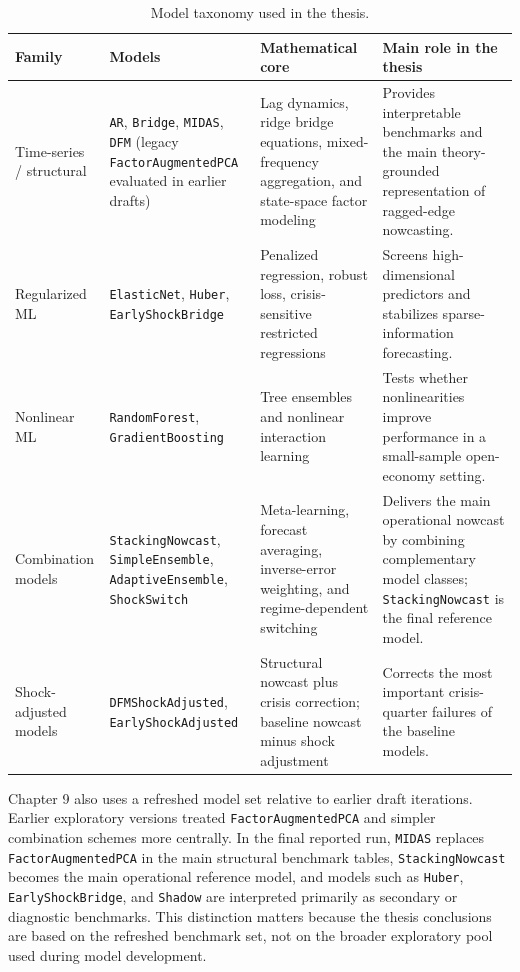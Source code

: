 \documentclass[12pt,a4paper]{article}
\begin{document}
\begin{table}[H]
    \centering
    \small
    \caption{Model taxonomy used in the thesis.}
    \label{tab:model_taxonomy_summary}
    \begin{tabularx}{\textwidth}{>{\raggedright\arraybackslash}p{2.0cm}YYY}
        \toprule
        Family & Models & Mathematical core & Main role in the thesis \\
        \midrule
        Time-series / structural & \texttt{AR}, \texttt{Bridge}, \texttt{MIDAS}, \texttt{DFM} (legacy \texttt{FactorAugmentedPCA} evaluated in earlier drafts) & Lag dynamics, ridge bridge equations, mixed-frequency aggregation, and state-space factor modeling & Provides interpretable benchmarks and the main theory-grounded representation of ragged-edge nowcasting. \\
        Regularized ML & \texttt{ElasticNet}, \texttt{Huber}, \texttt{EarlyShockBridge} & Penalized regression, robust loss, crisis-sensitive restricted regressions & Screens high-dimensional predictors and stabilizes sparse-information forecasting. \\
        Nonlinear ML & \texttt{RandomForest}, \texttt{GradientBoosting} & Tree ensembles and nonlinear interaction learning & Tests whether nonlinearities improve performance in a small-sample open-economy setting. \\
        Combination models & \texttt{StackingNowcast}, \texttt{SimpleEnsemble}, \texttt{AdaptiveEnsemble}, \texttt{ShockSwitch} & Meta-learning, forecast averaging, inverse-error weighting, and regime-dependent switching & Delivers the main operational nowcast by combining complementary model classes; \texttt{StackingNowcast} is the final reference model. \\
        Shock-adjusted models & \texttt{DFMShockAdjusted}, \texttt{EarlyShockAdjusted} & Structural nowcast plus crisis correction; baseline nowcast minus shock adjustment & Corrects the most important crisis-quarter failures of the baseline models. \\
        \bottomrule
    \end{tabularx}
\end{table}

Chapter 9 also uses a refreshed model set relative to earlier draft iterations. Earlier exploratory versions treated \texttt{FactorAugmentedPCA} and simpler combination schemes more centrally. In the final reported run, \texttt{MIDAS} replaces \texttt{FactorAugmentedPCA} in the main structural benchmark tables, \texttt{StackingNowcast} becomes the main operational reference model, and models such as \texttt{Huber}, \texttt{EarlyShockBridge}, and \texttt{Shadow} are interpreted primarily as secondary or diagnostic benchmarks. This distinction matters because the thesis conclusions are based on the refreshed benchmark set, not on the broader exploratory pool used during model development.
\end{document}
